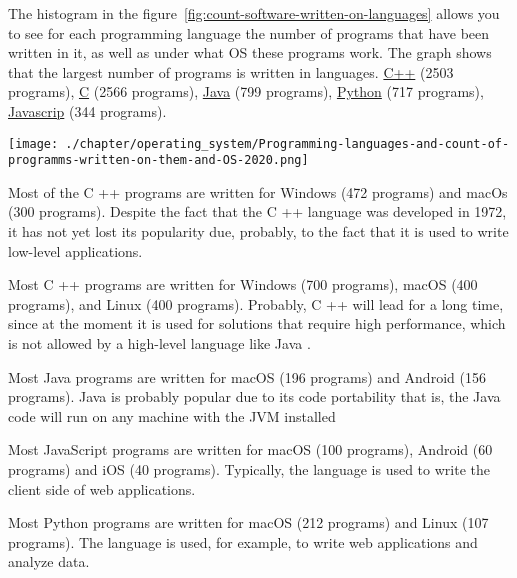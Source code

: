 The histogram in the figure~\ref{fig:count-software-written-on-languages} allows you to see for each programming language the number of programs that have been written in it, as well as under what OS these programs work. The graph shows that the largest number of programs is written in languages. \href{https://www.wikidata.org/wiki/Q2407}{C++} (2503 programs), 
\href{https://www.wikidata.org/wiki/Q15777}{C} (2566 programs), 
\href{https://www.wikidata.org/wiki/Q251}{Java} (799 programs),
\href{https://www.wikidata.org/wiki/Q28865}{Python} (717 programs),
\href{https://www.wikidata.org/wiki/Q2005}{Javascrip} (344 programs).


\begin{figure*}[h!]
	\texttt{[image: ./chapter/operating\_system/Programming-languages-and-count-of-programms-written-on-them-and-OS-2020.png]}
	\caption{Programming languages and the count of programs which for operating systems by these languages, 2020}
	\label{fig:count-software-written-on-languages}
\end{figure*}

Most of the C ++ programs are written for Windows (472 programs) and macOs (300 programs). Despite the fact that the C ++ language was developed in 1972, it has not yet lost its popularity due, probably, to the fact that it is used to write low-level applications.

Most C ++ programs are written for Windows (700 programs), macOS (400 programs), and Linux (400 programs). Probably, C ++ will lead for a long time, since at the moment it is used for solutions that require high performance, which is not allowed by a high-level language like Java \cite{Cilyurik2014LangPerformance}.

Most Java programs are written for macOS (196 programs) and Android (156 programs). Java is probably popular due to its code portability
that is, the Java code will run on any machine with the JVM installed

Most JavaScript programs are written for macOS (100 programs), Android (60 programs) and iOS (40 programs). Typically, the language is used to write the client side of web applications.

Most Python programs are written for macOS (212 programs) and Linux (107 programs). The language is used, for example, to write web applications and analyze data.

